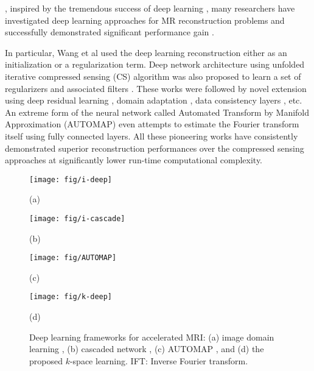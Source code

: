 \documentclass[10pt,journal]{IEEEtran}
\newcommand{\0}{{\boldsymbol{0}}}
\begin{document}
, 
inspired by the tremendous success of deep learning \cite{krizhevsky2012imagenet,he2016deep,ronneberger2015u}, 
many researchers have investigated deep learning approaches  for MR reconstruction problems
and successfully demonstrated significant performance gain
\cite{wang2016accelerating,hammernik2018learning,lee2018deep,han2017deep,jin2017deep,schlemper2018deep,zhu2018image}.


In particular,
Wang et al \cite{wang2016accelerating}  used the deep learning reconstruction either as  an initialization  or  a  regularization term.
Deep network architecture using unfolded iterative compressed sensing (CS) algorithm was also proposed   to learn a set of  regularizers and associated filters
\cite{hammernik2018learning}. 
These works were followed by novel
extension using deep residual learning \cite{lee2018deep}, domain adaptation \cite{han2017deep}, data consistency layers \cite{schlemper2018deep}, etc. An extreme form of the neural network called Automated Transform by Manifold Approximation
(AUTOMAP) \cite{zhu2018image} even attempts to estimate the Fourier transform itself using fully connected layers.
All these pioneering works have consistently demonstrated superior reconstruction performances over the compressed sensing approaches \cite{lustig2007sparse,jung2009k,shin2014calibrationless,haldar2014low,jin2016general,ongie2016off}
at significantly lower run-time computational complexity.


\begin{figure}[!hbt] 	
\centerline{\texttt{[image: fig/i-deep]}}
\vspace{-0.4cm}
\centerline{\mbox{(a)}}
\vspace{0.5cm}
\centerline{\texttt{[image: fig/i-cascade]}}
\vspace{-0.4cm}
\centerline{\mbox{(b)}}
\centerline{\texttt{[image: fig/AUTOMAP]}}
\vspace{-0.4cm}
\centerline{\mbox{(c)}}
\centerline{\texttt{[image: fig/k-deep]}}
\vspace{-0.4cm}
\centerline{\mbox{(d)}}
\caption{Deep learning frameworks for accelerated MRI: (a) image domain learning  \cite{lee2018deep,han2017deep}, (b) cascaded network \cite{hammernik2018learning,wang2016accelerating,schlemper2018deep}, (c) AUTOMAP \cite{zhu2018image},
and (d) the proposed $k$-space learning.  IFT: Inverse Fourier transform. }
\vspace*{-0.5cm}
\label{fig:deepMR}
\end{figure}
\end{document}
